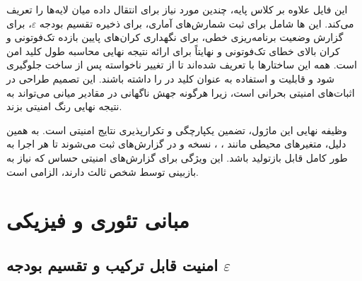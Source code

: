 این فایل علاوه بر کلاس پایه، چندین  مورد نیاز برای انتقال داده میان لایه‌ها را تعریف می‌کند. این ها شامل  برای ثبت شمارش‌های آماری،  برای ذخیره تقسیم بودجه $\varepsilon$،  برای گزارش وضعیت  برنامه‌ریزی خطی،  برای نگهداری کران‌های پایین بازده تک‌فوتونی و کران بالای خطای تک‌فوتونی و نهایتاً  برای ارائه نتیجه نهایی محاسبه طول کلید امن است. همه این ساختارها با  تعریف شده‌اند تا از تغییر ناخواسته پس از ساخت جلوگیری شود و قابلیت  و استفاده به عنوان کلید در  را داشته باشند. این تصمیم طراحی در اثبات‌های امنیتی بحرانی است، زیرا هرگونه جهش ناگهانی در مقادیر میانی می‌تواند به نتیجه نهایی رنگ امنیتی بزند.

وظیفه نهایی این ماژول، تضمین یکپارچگی و تکرارپذیری نتایج امنیتی است. به همین دلیل، متغیرهای محیطی مانند ، ، نسخه  و  در گزارش‌های  ثبت می‌شوند تا هر اجرا به طور کامل قابل بازتولید باشد. این ویژگی برای گزارش‌های امنیتی حساس که نیاز به بازبینی توسط شخص ثالث دارند، الزامی است.

\section{مبانی تئوری و فیزیکی}

\subsection{امنیت قابل ترکیب و تقسیم بودجه \texorpdfstring{$\varepsilon$}{epsilon}}


